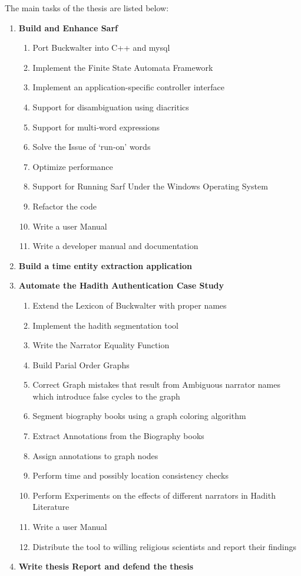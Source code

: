 \documentclass[a4,12pt]{report}
\begin{document}
The main tasks of the thesis are listed below: \\
\begin{enumerate}[1)]
\item \textbf{Build and Enhance Sarf}
	\begin{enumerate}
	\item Port Buckwalter into C++ and mysql
	\item Implement the Finite State Automata Framework
	\item Implement an application-specific controller interface
	\item Support for disambiguation using diacritics
	\item Support for multi-word expressions
	\item Solve the Issue of `run-on' words
	\item Optimize performance
	\item Support for Running Sarf Under the Windows Operating System
	\item Refactor the code
	\item Write a user Manual
	\item Write a developer manual and documentation
	\end{enumerate}
\item \textbf{Build a time entity extraction application}
\item \textbf{Automate the Hadith Authentication Case Study}
	\begin{enumerate}[3.1)]
	\item Extend the Lexicon of Buckwalter with proper names 
	\item Implement the hadith segmentation tool
	\item Write the Narrator Equality Function
	\item Build Parial Order Graphs
	\item Correct Graph mistakes that result from Ambiguous narrator names which introduce false cycles to the graph
	\item Segment biography books using a graph coloring algorithm
	\item Extract Annotations from the Biography books
	\item Assign annotations to graph nodes
	\item Perform time and possibly location consistency checks
	\item Perform Experiments on the effects of different narrators in Hadith Literature
	\item Write a user Manual
	\item Distribute the tool to willing religious scientists and report their findings
	\end{enumerate}
\item \textbf{Write thesis Report and defend the thesis}
\end{enumerate}
\end{document}
